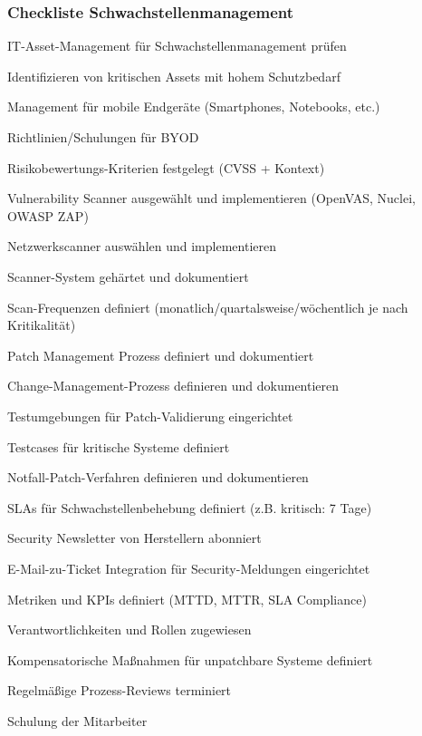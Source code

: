 \subsubsection{Checkliste Schwachstellenmanagement}


\begin{checklist}
\item IT-Asset-Management für Schwachstellenmanagement prüfen
\item Identifizieren von kritischen Assets mit hohem Schutzbedarf
\item Management für mobile Endgeräte (Smartphones, Notebooks, etc.)
\item Richtlinien/Schulungen für BYOD
\item Risikobewertungs-Kriterien festgelegt (CVSS + Kontext)
\item Vulnerability Scanner ausgewählt und implementieren (OpenVAS, Nuclei, OWASP ZAP)
\item Netzwerkscanner auswählen und implementieren
\item Scanner-System gehärtet und dokumentiert
\item Scan-Frequenzen definiert (monatlich/quartalsweise/wöchentlich je nach Kritikalität)
\item Patch Management Prozess definiert und dokumentiert
\item Change-Management-Prozess definieren und dokumentieren
\item Testumgebungen für Patch-Validierung eingerichtet
\item Testcases für kritische Systeme definiert
\item Notfall-Patch-Verfahren definieren und dokumentieren
\item SLAs für Schwachstellenbehebung definiert (z.B. kritisch: 7 Tage)
\item Security Newsletter von Herstellern abonniert
\item E-Mail-zu-Ticket Integration für Security-Meldungen eingerichtet
\item Metriken und KPIs definiert (MTTD, MTTR, SLA Compliance)
\item Verantwortlichkeiten und Rollen zugewiesen
\item Kompensatorische Maßnahmen für unpatchbare Systeme definiert
\item Regelmäßige Prozess-Reviews terminiert
\item Schulung der Mitarbeiter
\end{checklist}
